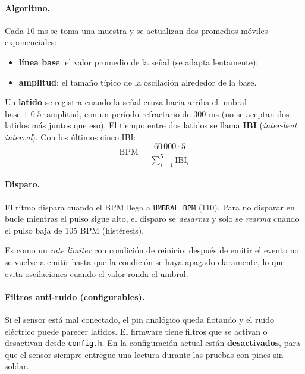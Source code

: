 \documentclass[11pt,a4paper]{article}
\begin{document}
\paragraph{Algoritmo.} Cada 10 ms se toma una muestra y se actualizan dos promedios
móviles exponenciales:
\begin{itemize}[leftmargin=*]
  \item \textbf{línea base}: el valor promedio de la señal (se adapta lentamente);
  \item \textbf{amplitud}: el tamaño típico de la oscilación alrededor de la base.
\end{itemize}
Un \textbf{latido} se registra cuando la señal cruza hacia arriba el umbral
$\text{base} + 0.5 \cdot \text{amplitud}$, con un período refractario de 300 ms (no se
aceptan dos latidos más juntos que eso). El tiempo entre dos latidos se llama
\textbf{IBI} (\emph{inter-beat interval}). Con los últimos cinco IBI:
\[
  \text{BPM} = \frac{60\,000 \cdot 5}{\sum_{i=1}^{5} \text{IBI}_i}
\]

\paragraph{Disparo.} El ritmo dispara cuando el BPM llega a \texttt{UMBRAL\_BPM}
(110). Para no disparar en bucle mientras el pulso sigue alto, el disparo se
\emph{desarma} y solo se \emph{rearma} cuando el pulso baja de 105 BPM (histéresis).

\begin{analogia}[histéresis]
Es como un \emph{rate limiter} con condición de reinicio: después de emitir el evento
no se vuelve a emitir hasta que la condición se haya apagado claramente, lo que evita
oscilaciones cuando el valor ronda el umbral.
\end{analogia}

\paragraph{Filtros anti-ruido (configurables).} Si el sensor está mal conectado, el pin
analógico queda flotando y el ruido eléctrico puede parecer latidos. El firmware tiene
filtros que se activan o desactivan desde \texttt{config.h}. En la configuración actual
están \textbf{desactivados}, para que el sensor siempre entregue una lectura durante
las pruebas con pines sin soldar.
\end{document}
